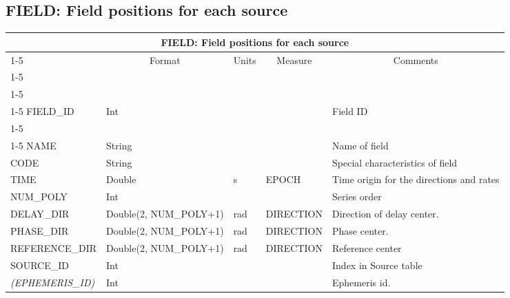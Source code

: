 \documentclass{article}
\newcommand{\defline}[1]{\cline{1-5}
\multicolumn{5}{|l|}{#1} \\
\cline{1-5}}
\newcommand{\definetable}[2]
{
	\vfill\newpage
	\subsection{#1}
        \vspace{0.15in}
        \small
	\begin{tabular}{|l|p{1.25in}|l|p{.9in}|p{1.4in}|}
	\hline
	\multicolumn{5}{|c|}{\bf #1}\\ 
	\cline{1-5}
        \multicolumn{1}{|c|}{Name}&\multicolumn{1}{|c|}{Format}&
        \multicolumn{1}{|c|}{Units}&\multicolumn{1}{|c|}{Measure}&
        \multicolumn{1}{|c|}{Comments}\\
        \cline{1-5}
        #2
        \hline
	\end{tabular}
}
\begin{document}
\definetable{FIELD: Field positions for each source}{
\defline{\bf Columns}
\defline{\em Key}
FIELD\_ID & Int & & & Field ID \\
\defline{\em Data}  
NAME &       String &    &      & Name of field \\
CODE &       String &    &      & Special characteristics of field \\
TIME &   Double  &      s  & EPOCH & Time origin for the directions and rates\\
NUM\_POLY & Int & & & Series order \\
DELAY\_DIR    &      Double(2, NUM\_POLY+1)  &      rad   &     DIRECTION & Direction of delay center. \\
PHASE\_DIR    &      Double(2, NUM\_POLY+1)  &      rad   &     DIRECTION & Phase center. \\
REFERENCE\_DIR &      Double(2, NUM\_POLY+1)  &      rad   &     DIRECTION & Reference center \\
SOURCE\_ID &      Int    &    &      & Index in Source table\\
{\it (EPHEMERIS\_ID)} &   Int    &    &      & Ephemeris id.\\
}
\end{document}
